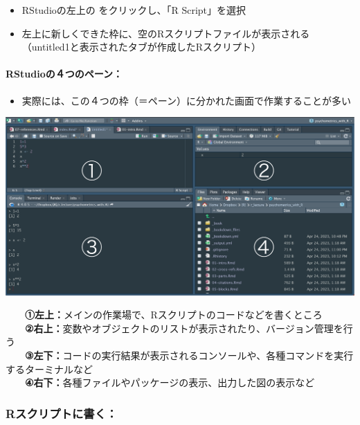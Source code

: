 \documentclass[
]{book}
\providecommand{\tightlist}{%
  \setlength{\itemsep}{0pt}\setlength{\parskip}{0pt}}
\begin{document}
\begin{itemize}
\tightlist
\item
  RStudioの左上の
  をクリックし、「R Script」を選択
\item
  左上に新しくできた枠に、空のRスクリプトファイルが表示される\\
  （untitled1と表示されたタブが作成したRスクリプト）
\end{itemize}

\hypertarget{rstudioux306euxff14ux3064ux306eux30daux30fcux30f3}{%
\paragraph*{RStudioの４つのペーン：}\label{rstudioux306euxff14ux3064ux306eux30daux30fcux30f3}}

\begin{itemize}
\tightlist
\item
  実際には、この４つの枠（＝ペーン）に分かれた画面で作業することが多い
\end{itemize}

\includegraphics{./img/01_rstudio_4pane.png}

　　\textbf{①左上：}メインの作業場で、Rスクリプトのコードなどを書くところ\\
　　\textbf{②右上：}変数やオブジェクトのリストが表示されたり、バージョン管理を行う\\
　　\textbf{③左下：}コードの実行結果が表示されるコンソールや、各種コマンドを実行するターミナルなど\\
　　\textbf{④右下：}各種ファイルやパッケージの表示、出力した図の表示など

\hypertarget{rux30b9ux30afux30eaux30d7ux30c8ux306bux66f8ux304f}{%
\subsubsection*{Rスクリプトに書く：}\label{rux30b9ux30afux30eaux30d7ux30c8ux306bux66f8ux304f}}
\end{document}
